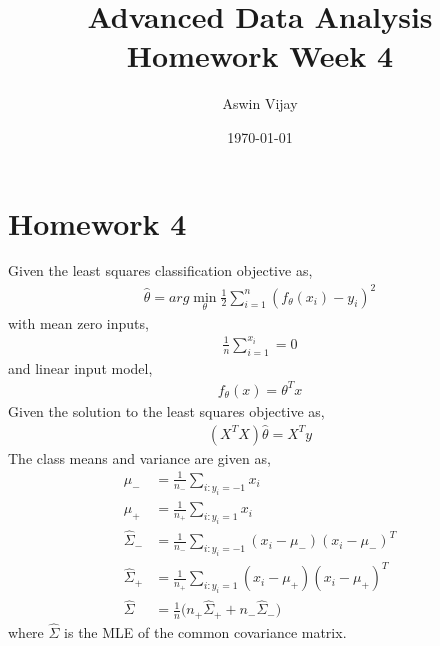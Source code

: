 \documentclass{article}
\title{Advanced Data Analysis\\Homework Week 4}
\author{Aswin Vijay}
\date\today
\begin{document}
\maketitle %

\section*{Homework 4}

Given the least squares classification objective as,
\begin{align*}
    \hat{\theta} = arg \min_{\theta}\frac{1}{2}\sum_{i=1}^{n}(f_\theta(x_i)-y_i)^2
\end{align*}
with mean zero inputs,
\begin{align}
    \frac{1}{n}\sum_{i=1}^{x_i} = 0
\end{align}
and linear input model,
\begin{align*}
    f_\theta(x)=\theta^T x
\end{align*}
Given the solution to the least squares objective as,
\begin{align}
    (X^T X)\hat{\theta} = X^T y
\end{align}
The class means and variance are given as,
\begin{align*}
    \mu_{-} &= \frac{1}{n_{-}}\sum_{i:y_i=-1}^{} x_i\\
    \mu_{+} &= \frac{1}{n_{+}}\sum_{i:y_i= 1}^{} x_i\\
    \hat{\Sigma}_{-} &= \frac{1}{n_{-}}\sum_{i:y_i=-1}^{}(x_i-\mu_{-})(x_i-\mu_{-})^T\\
    \hat{\Sigma}_{+} &= \frac{1}{n_{+}}\sum_{i:y_i=1}^{}(x_i-\mu_{+})(x_i-\mu_{+})^T\\
    \hat{\Sigma} &= \frac{1}{n}\biggl(n_{+}\hat{\Sigma}_{+}+n_{-}\hat{\Sigma}_{-}\biggr)
\end{align*}
where $\hat{\Sigma}$ is the MLE of the common covariance matrix.\\
\end{document}
